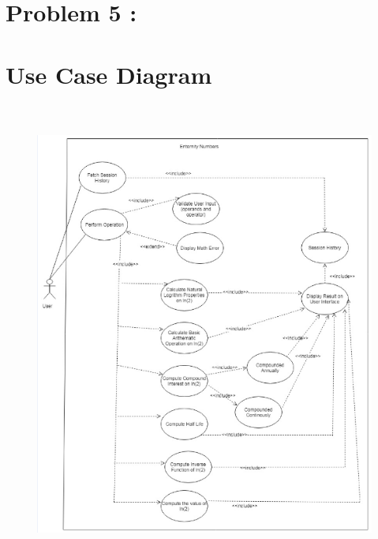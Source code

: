 \documentclass[12pt]{article}
\begin{document}

\par


\vspace{\baselineskip}
\vspace{\baselineskip}\section*{Problem 5 : }
\section*{Use Case Diagram}



\begin{figure}[H]
	\begin{Center}
		\includegraphics[width=5.51in,height=6.04in]{./media/image5.png}
	\end{Center}
\end{figure}
\end{document}
